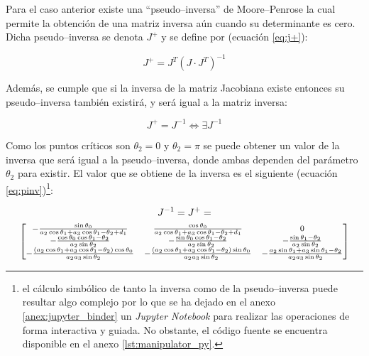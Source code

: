 Para el caso anterior existe una ``pseudo--inversa'' de Moore--Penrose \cite{PseudoinversaMoorePenrose2020}
la cual permite la obtención de una matriz inversa aún cuando su determinante es cero.
Dicha pseudo--inversa se denota $J^+$ y se define por (ecuación \ref{eq:j+}):

\begin{equation}\label{eq:j+}
    J^+ = J^T (J \cdot J^T)^{-1}
\end{equation}

Además, se cumple que si la inversa de la matriz Jacobiana existe entonces su pseudo--inversa
también existirá, y será igual a la matriz inversa:

\begin{equation*}
    J^+ = J^{-1} \iff \exists J^{-1}
\end{equation*}

Como los puntos críticos son $\theta_2 = 0$ y $\theta_2 = \pi$ se puede obtener un valor
de la inversa que será igual a la pseudo--inversa, donde ambas dependen del parámetro
$\theta_2$ para existir. El valor que se obtiene de la inversa es el siguiente (ecuación
\ref{eq:pinv})\footnote{el cálculo simbólico de tanto la inversa como de la pseudo--inversa
puede resultar algo complejo por lo que se ha dejado en el anexo \ref{anex:jupyter_binder}
un \textit{Jupyter Notebook} para realizar las operaciones de forma interactiva y guiada.
No obstante, el código fuente se encuentra disponible en el anexo \ref{lst:manipulator_py}.}:

\begin{gather}\label{eq:pinv}
    J^{-1} = J^+ = \\
    {\footnotesize\begin{bmatrix}
        - \frac{\sin{\theta_{0}}}{a_{2} \cos{\theta_{1}} + a_{3} \cos{\theta_{1} - \theta_{2}} + d_{1}}                                                 & \frac{\cos{\theta_{0}}}{a_{2} \cos{\theta_{1}} + a_{3} \cos{\theta_{1} - \theta_{2}} + d_{1}}                                                   & 0                                                                                                                                             \\
        - \frac{\cos{\theta_{0}} \cos{\theta_{1} - \theta_{2}}}{a_{2} \sin{\theta_{2}}}                                                                 & - \frac{\sin{\theta_{0}} \cos{\theta_{1} - \theta_{2}}}{a_{2} \sin{\theta_{2}}}                                                                 & - \frac{\sin{\theta_{1} - \theta_{2}}}{a_{2} \sin{\theta_{2}}}                                                    \\
        - \frac{\left(a_{2} \cos{\theta_{1}} + a_{3} \cos{\theta_{1} - \theta_{2}}\right) \cos{\theta_{0}}}{a_{2} a_{3} \sin{\theta_{2}}} & - \frac{\left(a_{2} \cos{\theta_{1}} + a_{3} \cos{\theta_{1} - \theta_{2}}\right) \sin{\theta_{0}}}{a_{2} a_{3} \sin{\theta_{2}}} & - \frac{a_{2} \sin{\theta_{1}} + a_{3} \sin{\theta_{1} - \theta_{2}}}{a_{2} a_{3} \sin{\theta_{2}}} \\
    \end{bmatrix}} \nonumber
\end{gather}

